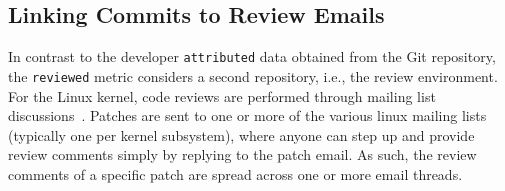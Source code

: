 








\subsection{Linking Commits to Review Emails}
\label{sec:link-comm-revi}

In contrast to the developer \texttt{attributed} data obtained from the Git repository, the \texttt{reviewed} metric considers a second repository, i.e., the review environment. For the Linux kernel, code reviews are performed through mailing list discussions~\cite{icst17,msr13jojo,jiang14}. %
Patches are sent to one or more of the various linux mailing lists (typically one per kernel subsystem), where anyone can step up and provide review comments simply by replying to the patch email. As such, the review comments of a specific patch are spread across one or more email threads.

